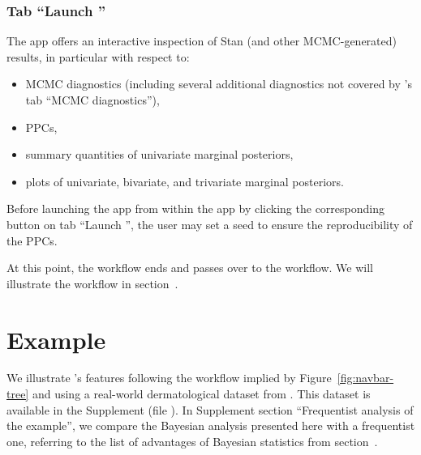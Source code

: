 \subsubsection[Tab "Launch shinystan"]{Tab ``Launch ''}
\label{tab-shinystan}

The  app \citep{gabry_shinystan_2018} offers an interactive
inspection of Stan (and other MCMC-generated) results, in particular with
respect to:
\begin{itemize}
  \item MCMC diagnostics (including several additional diagnostics not covered
  by 's tab ``MCMC diagnostics''),

  \item PPCs,

  \item summary quantities of univariate marginal posteriors,

  \item plots of univariate, bivariate, and trivariate marginal posteriors.
\end{itemize}

Before launching the  app from within the  app
by clicking the corresponding button on tab ``Launch '', the
user may set a seed to ensure the reproducibility of the PPCs.

At this point, the  workflow ends and passes over to the
 workflow. We will illustrate the  workflow in
section~.

\section{Example}
\label{exmpl}

We illustrate 's features following the workflow implied by
Figure~\ref{fig:navbar-tree} and using a real-world dermatological dataset
from \citet{welzen_response_2021}.
This dataset is available in the Supplement (file ).
In Supplement section ``Frequentist analysis of the example'', we compare
the Bayesian analysis presented here
with a frequentist one, referring to the list of advantages of Bayesian
statistics from section~.

